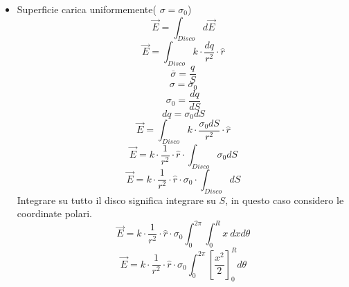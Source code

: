 \documentclass[twoside]{article}
\begin{document}
\begin{itemize}
    \item Superficie carica uniformemente( $\sigma = \sigma_0$)\\
          \begin{equation*}
              \vec{E} = \displaystyle \int_{Disco} d \vec{E}
          \end{equation*}
          \begin{equation*}
              \vec{E} = \displaystyle \int_{Disco} k \cdot \frac{dq}{r^2} \cdot \hat{r}
          \end{equation*}
          \begin{equation*}
              \overline{\sigma} = \displaystyle \frac{q}{S}
          \end{equation*}
          \begin{equation*}
              \sigma = \sigma_0
          \end{equation*}
          \begin{equation*}
              \sigma_0 = \displaystyle \frac{dq}{dS}
          \end{equation*}
          \begin{equation*}
              dq = \sigma_0 dS
          \end{equation*}
          \begin{equation*}
              \vec{E} = \displaystyle \int_{Disco} k \cdot \frac{\sigma_0 dS}{r^2} \cdot \hat{r}
          \end{equation*}
          \begin{equation*}
              \vec{E} = \displaystyle k \cdot \frac{1}{r^2} \cdot \hat{r} \cdot \int_{Disco} \sigma_0 dS
          \end{equation*}
          \begin{equation*}
              \vec{E} = \displaystyle k \cdot \frac{1}{r^2} \cdot \hat{r} \cdot \sigma_0 \cdot  \int_{Disco} dS
          \end{equation*}
          Integrare su tutto il disco significa integrare su $S$, in questo caso considero le coordinate polari.
          \begin{equation*}
              \vec{E} = \displaystyle k \cdot \frac{1}{r^2} \cdot \hat{r} \cdot \sigma_0 \int_{0}^{2\pi} \int_{0}^{R} x\ dx d\theta
          \end{equation*}
          \begin{equation*}
              \vec{E} = \displaystyle k \cdot \frac{1}{r^2} \cdot \hat{r} \cdot \sigma_0 \int_{0}^{2\pi} \left[\frac{x^2}{2}\right]_0^R d\theta

\end{equation*}
\end{itemize}
\end{document}

